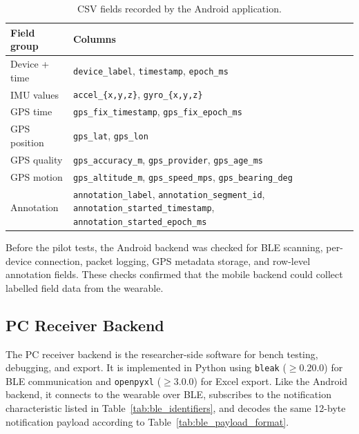 \begin{table}[!htbp]
    \centering
    \footnotesize
    \caption{CSV fields recorded by the Android application.}
    \label{tab:android_csv_format}
    \begin{tabularx}{\linewidth}{lX}
        \toprule
        Field group & Columns \\
        \midrule
        Device + time & \texttt{device\_label}, \texttt{timestamp}, \texttt{epoch\_ms} \\
        IMU values    & \texttt{accel\_\{x,y,z\}}, \texttt{gyro\_\{x,y,z\}} \\
        GPS time      & \texttt{gps\_fix\_timestamp}, \texttt{gps\_fix\_epoch\_ms} \\
        GPS position  & \texttt{gps\_lat}, \texttt{gps\_lon} \\
        GPS quality   & \texttt{gps\_accuracy\_m}, \texttt{gps\_provider}, \texttt{gps\_age\_ms} \\
        GPS motion    & \texttt{gps\_altitude\_m}, \texttt{gps\_speed\_mps}, \texttt{gps\_bearing\_deg} \\
        Annotation    & \texttt{annotation\_label}, \texttt{annotation\_segment\_id}, \texttt{annotation\_started\_timestamp}, \texttt{annotation\_started\_epoch\_ms} \\
        \bottomrule
    \end{tabularx}
\end{table}

Before the pilot tests, the Android backend was checked for BLE scanning, per-device connection, packet logging, GPS metadata storage, and row-level annotation fields. These checks confirmed that the mobile backend could collect labelled field data from the wearable.

\subsection{PC Receiver Backend}\label{sec:pc_receiver}

The PC receiver backend is the researcher-side software for bench testing, debugging, and export. It is implemented in Python using \texttt{bleak} (\(\ge 0.20.0\)) for BLE communication and \texttt{openpyxl} (\(\ge 3.0.0\)) for Excel export. Like the Android backend, it connects to the wearable over BLE, subscribes to the notification characteristic listed in Table~\ref{tab:ble_identifiers}, and decodes the same 12-byte notification payload according to Table~\ref{tab:ble_payload_format}.


